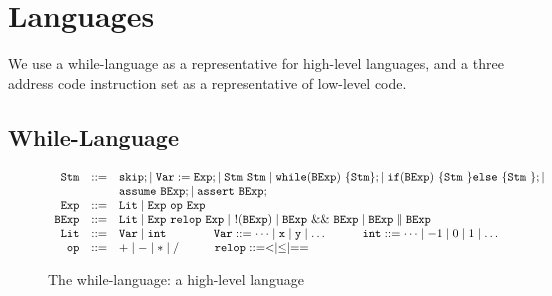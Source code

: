 \documentclass{llncs}
\begin{document}
\vspace{-10pt}

\section{Languages}
We use a while-language as a representative for high-level languages,
and a three address code instruction set as a
representative of low-level code.

\vspace{-13pt}
\subsection{While-Language}

\begin{figure}[t]
\vspace*{-10pt}
\[
  \begin{array}{rcll}
    \mathtt{Stm} &::=&  \mathtt{skip}; \mid \mathtt{Var} := \mathtt{Exp}; \mid \mathtt{Stm}~ \mathtt{Stm} \mid \mathtt{while}(\mathtt{BExp})~\{\mathtt{Stm}\};  \mid \mathtt{if}(\mathtt{BExp})~ \{ \mathtt{Stm}~ \} \mathtt{else}~\{ \mathtt{Stm}\ \}; \mid \\
&& \mathtt{assume}~ \mathtt{BExp}; \mid \mathtt{assert}~ \mathtt{BExp}; \\
    \mathtt{Exp} & ::= & \mathtt{Lit} \mid \mathtt{Exp}~ \mathtt{op}~ \mathtt{Exp}   \\
    \mathtt{BExp} & ::= & \mathtt{Lit} \mid \mathtt{Exp}~ \mathtt{relop}~ \mathtt{Exp} \mid ~!(\mathtt{BExp}) \mid  \mathtt{BExp}~ \&\&~ \mathtt{BExp} \mid \mathtt{BExp} \parallel \mathtt{BExp} \\
    \mathtt{Lit} & ::= & \mathtt{Var} \mid \mathtt{int}   \quad \quad \quad  \quad \mathtt{Var}  :: = \dots \mid \mathtt{x} \mid \mathtt{y} \mid \dots \quad \quad \quad     \mathtt{int}  :: =  \dots \mid -1 \mid 0 \mid 1 \mid \dots \\
   \mathtt{op} & ::= & + \mid - \mid * \mid /\quad \quad \quad     \mathtt{relop}  ::=  < \mid \leq \mid ==   
  \end{array}
\]
\vspace*{-10pt}
  \caption{The while-language: a high-level language}
  \label{fig:WhileLanguage}
\end{figure}
\end{document}
